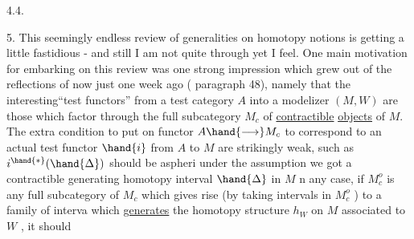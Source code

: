 4.4.

5. This seemingly endless review of generalities on homotopy notions
is getting a little fastidious - and still I am not quite through yet
I feel. One main motivation for embarking on this review was one strong
impression which grew out of the reflections of now just one week ago
( paragraph 48), namely that the interesting``test functors'' from a
test category $A$ into a modelizer $(M,W)$ are those which factor through
the full subcategory $M_c$ of \uline{contractible} \uline{objects} of $M$. The  extra condition
to put on   functor $A \hand{\longrightarrow} M_c$ to correspond to an actual test functor $\hand{i}$
from $A$ to $M$ are strikingly weak, such as\hand{:} $i^{\hand{*}}(\hand{\Delta})$ should be  aspheri
  under the assumption we got a contractible generating homotopy interval
$\hand{\Delta}$ in $M$  n any case, if $M^o_c$ is any full subcategory of $M_c$ which 
gives rise (by taking intervals in $M^o_c$ ) to a  family of  interva
which \uline{generates} the homotopy structure $h_W$ on $M$ associated to $W$ , it should
